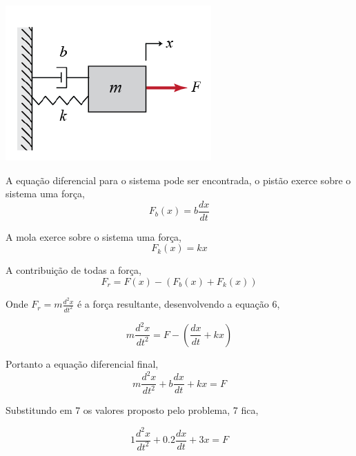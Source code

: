 \documentclass[a4paper, 10pt]{article}
\begin{document}
\begin{list}{\textbf{Questão .}}{
\setlength{\labelwidth}{-2mm} \setlength{\parsep}{0mm}
\setlength{\topsep}{0mm} \setlength{\leftmargin}{0mm}}
            \begin{center}
            \includegraphics[scale=0.6]{fig6a.png}
            \end{center}
 

         A equação diferencial para o sistema pode ser encontrada, o pistão 
         exerce sobre o sistema uma força, 
         \begin{equation}
             F_b(x) = b \frac{d x}{d t}
         \end{equation}

         A mola exerce sobre o sistema uma força,
         \begin{equation}
             F_k(x) = k x
         \end{equation}

         A contribuição de todas a força,
        \begin{equation}
            F_r = F(x) - (F_b(x) + F_k(x))
        \end{equation}

        Onde $F_r = m \frac{d^2 x}{d t^2}$ é a força resultante, desenvolvendo a equação 6,

        $$ 
        m \frac{d^2 x}{d t^2} = F - (\frac{d x}{d t} + k x)
        $$

         Portanto a equação diferencial final, 
        \begin{equation} 
            m \frac{d^2 x}{d t^2} +  b \frac{d x}{d t} + k x = F
        \end{equation}

        Substitundo em 7 os valores proposto pelo problema, 7 fica,

        \begin{equation}
            1 \frac{d^2 x}{d t^2} +  0.2 \frac{d x}{d t} + 3 x = F
        \end{equation}




\end{list}
\end{document}
